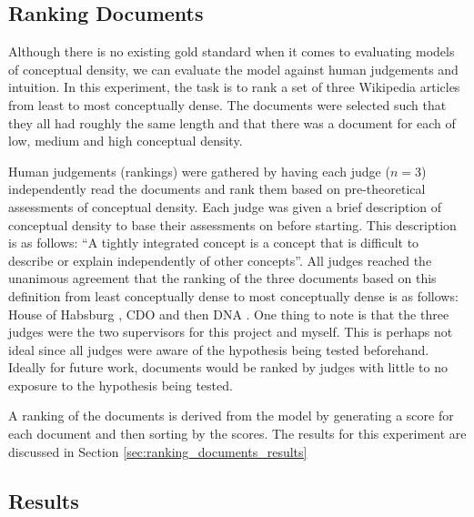 \documentclass[12pt]{article}
\theoremstyle{grammarstyle}
\begin{document}

\subsection{Ranking Documents} \label{sec:ranking_documents}
Although there is no existing gold standard when it comes to evaluating models of conceptual density, we can evaluate the model against human judgements and intuition. In this experiment, the task is to rank a set of three Wikipedia articles \citep{wiki:habsburg, wiki:cdo, wiki:dna} from least to most conceptually dense. The documents were selected such that they all had roughly the same length and that there was a document for each of low, medium and high conceptual density.

Human judgements (rankings) were gathered by having each judge ($n=3$) independently read the documents and rank them based on pre-theoretical assessments of conceptual density. Each judge was given a brief description of conceptual density to base their assessments on before starting. This description is as follows: ``A tightly integrated concept is a concept that is difficult to describe or explain independently of other concepts''.
All judges reached the unanimous agreement that the ranking of the three documents based on this definition from least conceptually dense to most conceptually dense is as follows: House of Habsburg \citep{wiki:habsburg}, CDO \citep{wiki:cdo} and then DNA \citep{wiki:dna}. One thing to note is that the three judges were the two supervisors for this project and myself.
This is perhaps not ideal since all judges were aware of the hypothesis being tested beforehand.
Ideally for future work, documents would be ranked by judges with little to no exposure to the hypothesis being tested.

A ranking of the documents is derived from the model by generating a score for each document and then sorting by the scores.
The results for this experiment are discussed in Section \ref{sec:ranking_documents_results}

\subsection{Results}
\end{document}
